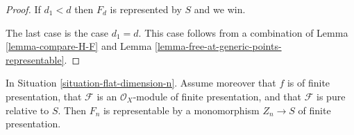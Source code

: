 \begin{proof}
\medskip\noindent
If $d_1 < d$ then $F_d$ is represented by $S$ and we win.

\medskip\noindent
The last case is the case $d_1 = d$. This case follows from a combination of
Lemma \ref{lemma-compare-H-F}
and
Lemma \ref{lemma-free-at-generic-points-representable}.
\end{proof}

\begin{theorem}
\label{theorem-flat-dimension-n-representable}
In Situation \ref{situation-flat-dimension-n}.
Assume moreover that $f$ is of finite presentation, that
$\mathcal{F}$ is an $\mathcal{O}_X$-module of finite presentation,
and that $\mathcal{F}$ is pure relative to $S$.
Then $F_n$ is representable by a monomorphism
$Z_n \to S$ of finite presentation.
\end{theorem}


